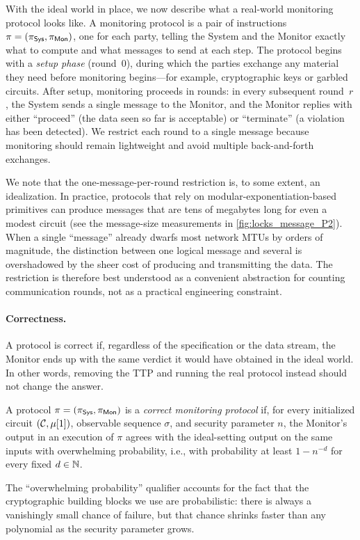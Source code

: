With the ideal world in place, we now describe what a real-world monitoring protocol looks like. A monitoring protocol is a pair of instructions $\pi= \left( \pi_{\textsf{Sys}},\pi_{\textsf{Mon}} \right)$, one for each party, telling the System and the Monitor exactly what to compute and what messages to send at each step. The protocol begins with a \emph{setup phase} (round~$0$), during which the parties exchange any material they need before monitoring begins---for example, cryptographic keys or garbled circuits. After setup, monitoring proceeds in rounds: in every subsequent round~$r$, the System sends a single message to the Monitor, and the Monitor replies with either ``proceed'' (the data seen so far is acceptable) or ``terminate'' (a violation has been detected). We restrict each round to a single message because monitoring should remain lightweight and avoid multiple back-and-forth exchanges.

We note that the one-message-per-round restriction is, to some extent, an idealization. In practice, protocols that rely on modular-exponentiation-based primitives can produce messages that are tens of megabytes long for even a modest circuit (see the message-size measurements in \cref{fig:locks_message_P2}). When a single ``message'' already dwarfs most network MTUs by orders of magnitude, the distinction between one logical message and several is overshadowed by the sheer cost of producing and transmitting the data. The restriction is therefore best understood as a convenient abstraction for counting communication rounds, not as a practical engineering constraint.

\paragraph{Correctness.}
A protocol is correct if, regardless of the specification or the data stream, the Monitor ends up with the same verdict it would have obtained in the ideal world. In other words, removing the TTP and running the real protocol instead should not change the answer.
\begin{definition}[Correctness]\label{def:correctness}
    A protocol $\pi=\left( \pi_{\textsf{Sys}},\pi_{\textsf{Mon}} \right)$ is a \emph{correct monitoring protocol} if, for every initialized circuit $(\mathcal{C},\mu[1])$, observable sequence $\sigma$, and security parameter $n$, the Monitor's output in an execution of $\pi$ agrees with the ideal-setting output on the same inputs with overwhelming probability, i.e., with probability at least $1-n^{-d}$ for every fixed $d\in\mathbb{N}$.
\end{definition}
The ``overwhelming probability'' qualifier accounts for the fact that the cryptographic building blocks we use are probabilistic: there is always a vanishingly small chance of failure, but that chance shrinks faster than any polynomial as the security parameter grows.

